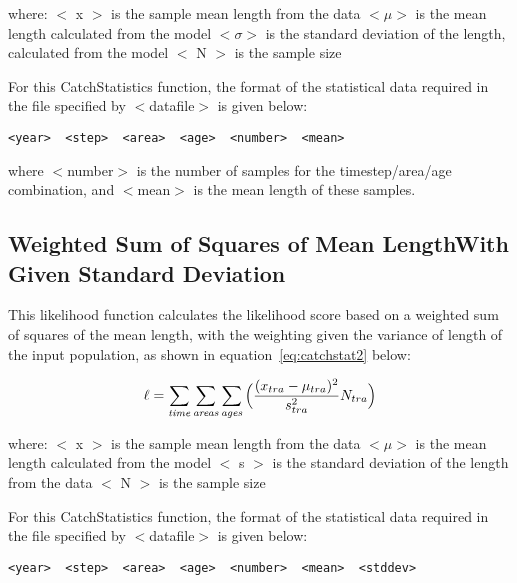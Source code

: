 \documentclass[10pt,twoside]{book}
\begin{document}
where:\newline
$<$ x $>$ is the sample mean length from the data\newline
$<\mu>$ is the mean length calculated from the model\newline
$<\sigma>$ is the standard deviation of the length, calculated from the model\newline
$<$ N $>$ is the sample size

\bigskip
For this CatchStatistics function, the format of the statistical data required in the file specified by $<$datafile$>$ is given below:

{\small\begin{verbatim}
<year>  <step>  <area>  <age>  <number>  <mean>
\end{verbatim}}

where $<$number$>$ is the number of samples for the timestep/area/age combination, and $<$mean$>$ is the mean length of these samples.

\subsection{Weighted Sum of Squares of Mean Length\newline With Given Standard Deviation}
This likelihood function calculates the likelihood score based on a weighted sum of squares of the mean length, with the weighting given the variance of length of the input population, as shown in  equation~\ref{eq:catchstat2} below:

\begin{equation}\label{eq:catchstat2}
\ell = \sum_{\it time}\sum_{\it areas}\sum_{\it ages} \Big(\frac{(x_{tra}-\mu_{tra})^2} {s_{tra}^2} N_{tra}\Big)
\end{equation}

where:\newline
$<$ x $>$ is the sample mean length from the data\newline
$<\mu>$ is the mean length calculated from the model\newline
$<$ s $>$ is the standard deviation of the length from the data\newline
$<$ N $>$ is the sample size

\bigskip
For this CatchStatistics function, the format of the statistical data required in the file specified by $<$datafile$>$ is given below:

{\small\begin{verbatim}
<year>  <step>  <area>  <age>  <number>  <mean>  <stddev>
\end{verbatim}}
\end{document}

